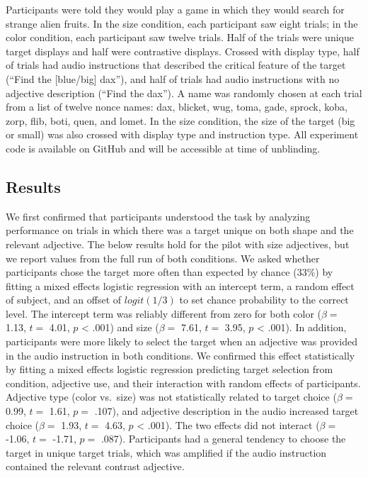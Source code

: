 \documentclass[10pt, letterpaper]{article}
\begin{document}
Participants were told they would play a game in which they would search
for strange alien fruits. In the size condition, each participant saw
eight trials; in the color condition, each participant saw twelve
trials. Half of the trials were unique target displays and half were
contrastive displays. Crossed with display type, half of trials had
audio instructions that described the critical feature of the target
(``Find the {[}blue/big{]} dax''), and half of trials had audio
instructions with no adjective description (``Find the dax''). A name
was randomly chosen at each trial from a list of twelve nonce names:
dax, blicket, wug, toma, gade, sprock, koba, zorp, flib, boti, quen, and
lomet. In the size condition, the size of the target (big or small) was
also crossed with display type and instruction type. All experiment code
is available on GitHub and will be accessible at time of unblinding.

\subsection{Results}\label{results}

We first confirmed that participants understood the task by analyzing
performance on trials in which there was a target unique on both shape
and the relevant adjective. The below results hold for the pilot with
size adjectives, but we report values from the full run of both
conditions. We asked whether participants chose the target more often
than expected by chance (\(33\%\)) by fitting a mixed effects logistic
regression with an intercept term, a random effect of subject, and an
offset of \(logit(1/3)\) to set chance probability to the correct level.
The intercept term was reliably different from zero for both color
(\(\beta =\) 1.13, \(t =\) 4.01, \(p\) \textless{} .001) and size
(\(\beta =\) 7.61, \(t =\) 3.95, \(p\) \textless{} .001). In addition,
participants were more likely to select the target when an adjective was
provided in the audio instruction in both conditions. We confirmed this
effect statistically by fitting a mixed effects logistic regression
predicting target selection from condition, adjective use, and their
interaction with random effects of participants. Adjective type (color
vs.~size) was not statistically related to target choice (\(\beta =\)
0.99, \(t =\) 1.61, \(p =\) .107), and adjective description in the
audio increased target choice (\(\beta =\) 1.93, \(t =\) 4.63, \(p\)
\textless{} .001). The two effects did not interact (\(\beta =\) -1.06,
\(t =\) -1.71, \(p =\) .087). Participants had a general tendency to
choose the target in unique target trials, which was amplified if the
audio instruction contained the relevant contrast adjective.
\end{document}
